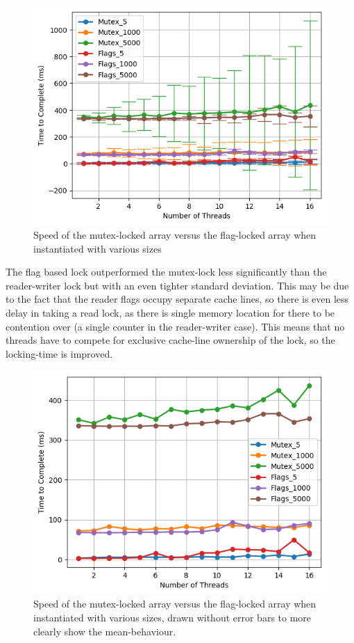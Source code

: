 \documentclass[11pt]{article}
\begin{document}
\begin{figure}
\centering
\includegraphics[scale=0.65]{step6_1.png}
\caption{Speed of the mutex-locked array versus the flag-locked array when instantiated with various sizes}
\label{fig:step6_1}
\end{figure}

The flag based lock outperformed the mutex-lock less significantly than the reader-writer lock but with an even tighter standard deviation. This may be due to the fact that the reader flags occupy separate cache lines, so there is even less delay in taking a read lock, as there is single memory location for there to be contention over (a single counter in the reader-writer case). This means that no threads have to compete for exclusive cache-line ownership of the lock, so the locking-time is improved.

\begin{figure}
\centering
\includegraphics[scale=0.65]{step6_2.png}
\caption{Speed of the mutex-locked array versus the flag-locked array when instantiated with various sizes, drawn without error bars to more clearly show the mean-behaviour.}
\label{fig:step6_2}
\end{figure}
\end{document}
